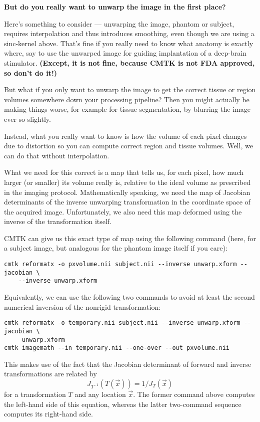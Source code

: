 \documentclass{InsightArticle}
\begin{document}
{\bf But do you really want to unwarp the image in the first place?}

Here's something to consider --- unwarping the image, phantom or subject,
requires interpolation and thus introduces smoothing, even though we are using
a sinc-kernel above. That's fine if you really need to know what anatomy is
exactly where, say to use the unwarped image for guiding implantation of a
deep-brain stimulator. {\bf (Except, it is not fine, because CMTK is not FDA
approved, so don't do it!)}

But what if you only want to unwarp the image to get the correct tissue or
region volumes somewhere down your processing pipeline? Then you might
actually be making things worse, for example for tissue segmentation, by
blurring the image ever so slightly.

Instead, what you really want to know is how the volume of each pixel changes
due to distortion so you can compute correct region and tissue volumes. Well,
we can do that without interpolation.

What we need for this correct is a map that tells us, for each pixel, how much
larger (or smaller) its volume really is, relative to the ideal volume as
prescribed in the imaging protocol. Mathematically speaking, we need the map
of Jacobian determinants of the inverse unwarping transformation in the
coordinate space of the acquired image. Unfortunately, we also need this map
deformed using the inverse of the transformation itself.

CMTK can give us this exact type of map using the following command (here, for
a subject image, but analogous for the phantom image itself if you care):
\begin{verbatim}
cmtk reformatx -o pxvolume.nii subject.nii --inverse unwarp.xform --jacobian \
    --inverse unwarp.xform
\end{verbatim}
Equivalently, we can use the following two commands to avoid at least the
second numerical inversion of the nonrigid transformation:
\begin{verbatim}
cmtk reformatx -o temporary.nii subject.nii --inverse unwarp.xform --jacobian \
     unwarp.xform
cmtk imagemath --in temporary.nii --one-over --out pxvolume.nii
\end{verbatim}
This makes use of the fact that the Jacobian determinant of forward and
inverse transformations are related by 
$$J_{T^{-1}}(T(\vec{x})) = 1/J_{T}(\vec{x})$$
for a transformation $T$ and any location $\vec{x}$. The former command above
computes the left-hand side of this equation, whereas the latter two-command
sequence computes its right-hand side.
\end{document}
